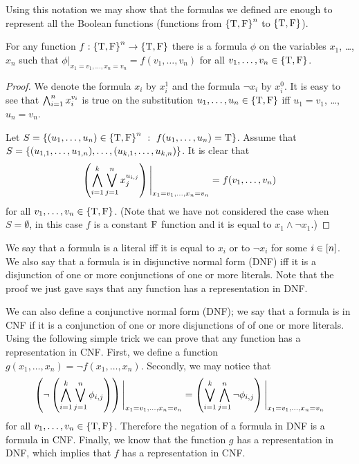 Using this notation we may show that the formulas we defined are enough to
represent all the Boolean functions
(functions from $\set{\ltrue, \lfalse}^n$ to $\set{\ltrue, \lfalse}$).
\begin{theorem}
  For any function $f : \set{\ltrue, \lfalse}^n \to
  \set{\ltrue, \lfalse}$ there is a
  formula $\phi$ on the variables $x_1$, \dots, $x_n$ such that
  $\phi\big\rvert_{x_1 = v_1, \dots, x_n = v_n} = f(v_1, \dots, v_n)$ for all
  $v_1, \dots, v_n \in \set{\ltrue, \lfalse}$.
\end{theorem}
\begin{proof}
  We denote the formula $x_i$ by $x_i^1$ and the formula $\lnot x_i$ by $x_i^0$.
  It is easy to see that $\bigwedge_{i = 1}^n x_i^{v_i}$ is true on the
  substitution $u_1, \dots, u_n \in \set{\ltrue, \lfalse}$ iff $u_1 = v_1$,
  \dots, $u_n = v_n$.

  Let $S = \set[f(u_1, \dots, u_n) = \ltrue]{(u_1, \dots, u_n) \in
    \set{\ltrue, \lfalse}^n}$.
  Assume that
  $S = \set{(u_{1, 1}, \dots, u_{1, n}), \dots, (u_{k, 1}, \dots, u_{k, n})}$.
  It is clear that
  \[
    \left(
      \bigwedge_{i = 1}^k
        \bigvee_{j = 1}^n x_j^{u_{i, j}}
    \right)\Bigg\rvert_{x_1 = v_1, \dots, x_n = v_n}
    =
    f(v_1, \dots, v_n)
  \]
  for all $v_1, \dots, v_n \in \set{\ltrue, \lfalse}$.
  (Note that we have not considered the case when $S = \emptyset$, in this
  case $f$ is a constant $\text{F}$ function and it is equal to
  $x_1 \land \lnot x_1$.)
\end{proof}

We say that a formula is a literal iff it is equal to $x_i$ or to $\lnot x_i$
for some $i \in [{n}]$.
We also say that a formula is in disjunctive normal form (DNF) iff
it is a disjunction of one or more conjunctions of one or more literals.
Note that the proof we just gave says that any function has a representation in
DNF.

We can also define a conjunctive normal form (DNF); we say that a formula is in
CNF if it is a conjunction of one or more disjunctions of of one or
more literals. Using the following simple trick we can prove that any function
has a representation in CNF. First, we define a function
$g(x_1, \dots, x_n) = \lnot f(x_1, \dots, x_n)$. Secondly, we may notice that
\[
  \left(
    \lnot
    \left(
      \bigwedge_{i = 1}^k \bigvee_{j = 1}^n \phi_{i, j}
    \right)
  \right) \Bigg\rvert_{x_1 = v_1, \dots, x_n = v_n}
  =
  \left(
    \bigvee_{i = 1}^k \bigwedge_{j = 1}^n \lnot \phi_{i, j}
  \right)\Bigg\rvert_{x_1 = v_1, \dots, x_n = v_n}
\]
for all $v_1, \dots, v_n \in \set{\ltrue, \lfalse}$. Therefore the negation
of a formula in DNF is a formula in CNF. Finally, we know that the function
$g$ has a representation in DNF, which implies that $f$ has a representation
in CNF.


